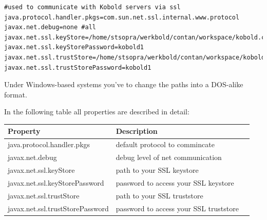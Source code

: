 \begin{verbatim}
#used to communicate with Kobold servers via ssl
java.protocol.handler.pkgs=com.sun.net.ssl.internal.www.protocol
javax.net.debug=none #all
javax.net.ssl.keyStore=/home/stsopra/werkbold/contan/workspace/kobold.common/kobold.common/scripts/keystore
javax.net.ssl.keyStorePassword=kobold1
javax.net.ssl.trustStore=/home/stsopra/werkbold/contan/workspace/kobold.common/kobold.common/scripts/truststore
javax.net.ssl.trustStorePassword=kobold1
\end{verbatim}

Under Windows-based systems you've to change the paths into a
DOS-alike format.

In the following table all properties are described in detail:

\begin{tabular}{|l|l|l|}\hline
\textbf{Property} &  \textbf{Description}\\ \hline
java.protocol.handler.pkgs & default protocol to commincate \\ \hline
javax.net.debug & debug level of net communication \\ \hline
javax.net.ssl.keyStore & path to your SSL keystore \\ \hline
javax.net.ssl.keyStorePassword & password to access your SSL keystore \\
    \hline
javax.net.ssl.trustStore & path to your SSL truststore \\ \hline
javax.net.ssl.trustStorePassword & password to access your SSL
truststore \\ \hline
\end{tabular}